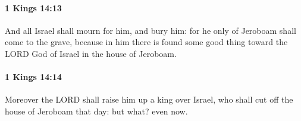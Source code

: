 		\paragraph{1 Kings 14:13} %
			\label{1KINGS-14-13}

			And all Israel shall mourn for him, and bury him: for he only of Jeroboam shall come to the grave, because in him there is found some good thing toward the LORD God of Israel in the house of Jeroboam.


		\paragraph{1 Kings 14:14} %
			\label{1KINGS-14-14}

			Moreover the LORD shall raise him up a king over Israel, who shall cut off the house of Jeroboam that day: but what? even now.


